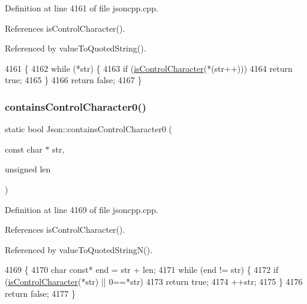 Definition at line 4161 of file jsoncpp.\+cpp.



References is\+Control\+Character().



Referenced by value\+To\+Quoted\+String().


\begin{DoxyCode}
4161                                                       \{
4162   \textcolor{keywordflow}{while} (*str) \{
4163     \textcolor{keywordflow}{if} (\hyperlink{namespace_json_a0381e631737f51331065a388f4f59197}{isControlCharacter}(*(str++)))
4164       \textcolor{keywordflow}{return} \textcolor{keyword}{true};
4165   \}
4166   \textcolor{keywordflow}{return} \textcolor{keyword}{false};
4167 \}
\end{DoxyCode}
\mbox{\label{namespace_json_ae8a357381f264cf28f46449e79ab1dea}} 
\subsubsection{\texorpdfstring{contains\+Control\+Character0()}{containsControlCharacter0()}}
{\footnotesize\ttfamily static bool Json\+::contains\+Control\+Character0 (\begin{DoxyParamCaption}\item[{const char $\ast$}]{str,  }\item[{unsigned}]{len }\end{DoxyParamCaption})\hspace{0.3cm}{\ttfamily [static]}}



Definition at line 4169 of file jsoncpp.\+cpp.



References is\+Control\+Character().



Referenced by value\+To\+Quoted\+String\+N().


\begin{DoxyCode}
4169                                                                      \{
4170   \textcolor{keywordtype}{char} \textcolor{keyword}{const}* end = str + len;
4171   \textcolor{keywordflow}{while} (end != str) \{
4172     \textcolor{keywordflow}{if} (\hyperlink{namespace_json_a0381e631737f51331065a388f4f59197}{isControlCharacter}(*str) || 0==*str)
4173       \textcolor{keywordflow}{return} \textcolor{keyword}{true};
4174     ++str;
4175   \}
4176   \textcolor{keywordflow}{return} \textcolor{keyword}{false};
4177 \}
\end{DoxyCode}
\mbox{\label{namespace_json_a4d6ab0f651348832e5cc49b577a854d2}} 
